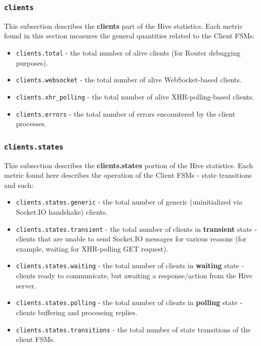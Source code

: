 \documentclass[a4paper]{article}
\begin{document}
\subsubsection{\texttt{clients}}
\label{sec-4-2-4}

This subsection describes the \textbf{clients} part of the Hive statistics. Each metric found in this section measures the general quantities related to the Client FSMs:


\begin{itemize}
\item \texttt{clients.total} - the total number of alive clients (for Router debugging purposes).
\item \texttt{clients.websocket} - the total number of alive WebSocket-based clients.
\item \texttt{clients.xhr\_polling} - the total number of alive XHR-polling-based clients.
\item \texttt{clients.errors} - the total number of errors encountered by the client processes.
\end{itemize}
\subsubsection{\texttt{clients.states}}
\label{sec-4-2-5}

This subsection describes the \textbf{clients.states} portion of the Hive statistics. Each metric found here describes the operation of the Client FSMs - state transitions and such:


\begin{itemize}
\item \texttt{clients.states.generic} - the total number of generic (uninitialized via Socket.IO handshake) clients.
\item \texttt{clients.states.transient} - the total number of clients in \textbf{transient} state - clients that are unable to send Socket.IO messages for various reasons (for example, waiting for XHR-polling GET request).
\item \texttt{clients.states.waiting} - the total number of clients in \textbf{waiting} state - clients ready to communicate, but awaiting a response/action from the Hive server.
\item \texttt{clients.states.polling} - the total number of clients in \textbf{polling} state - clients buffering and processing replies.
\item \texttt{clients.states.transitions} - the total number of state transitions of the client FSMs.
\end{itemize}
\end{document}
